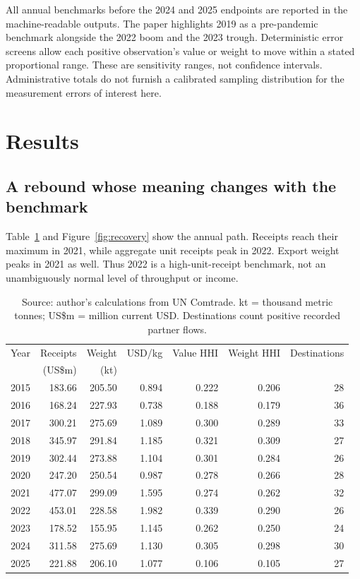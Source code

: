 \documentclass[11pt,a4paper]{article}
\begin{document}
All annual benchmarks before the 2024 and 2025 endpoints are reported in the machine-readable outputs. The paper highlights 2019 as a pre-pandemic benchmark alongside the 2022 boom and the 2023 trough. Deterministic error screens allow each positive observation's value or weight to move within a stated proportional range. These are sensitivity ranges, not confidence intervals. Administrative totals do not furnish a calibrated sampling distribution for the measurement errors of interest here.

\section{Results}
\subsection{A rebound whose meaning changes with the benchmark}
Table~\ref{tab:annual} and Figure~\ref{fig:recovery} show the annual path. Receipts reach their maximum in 2021, while aggregate unit receipts peak in 2022. Export weight peaks in 2021 as well. Thus 2022 is a high-unit-receipt benchmark, not an unambiguously normal level of throughput or income.

\begin{table}[htbp]\centering\small
\caption{Georgia's silicomanganese exports: complete annual series.}\label{tab:annual}
\begin{tabular}{rrrrrrr}\toprule
Year & Receipts & Weight & USD/kg & Value HHI & Weight HHI & Destinations\\
 & (US\$m) & (kt) & & & & \\\midrule
2015 &183.66&205.50&0.894&0.222&0.206&28\\
2016 &168.24&227.93&0.738&0.188&0.179&36\\
2017 &300.21&275.69&1.089&0.300&0.289&33\\
2018 &345.97&291.84&1.185&0.321&0.309&27\\
2019 &302.44&273.88&1.104&0.301&0.284&26\\
2020 &247.20&250.54&0.987&0.278&0.266&28\\
2021 &477.07&299.09&1.595&0.274&0.262&32\\
2022 &453.01&228.58&1.982&0.339&0.290&26\\
2023 &178.52&155.95&1.145&0.262&0.250&24\\
2024 &311.58&275.69&1.130&0.305&0.298&30\\
2025 &221.88&206.10&1.077&0.106&0.105&27\\\bottomrule
\end{tabular}
\caption*{Source: author's calculations from UN Comtrade. kt = thousand metric tonnes; US\$m = million current USD. Destinations count positive recorded partner flows.}
\end{table}
\end{document}
